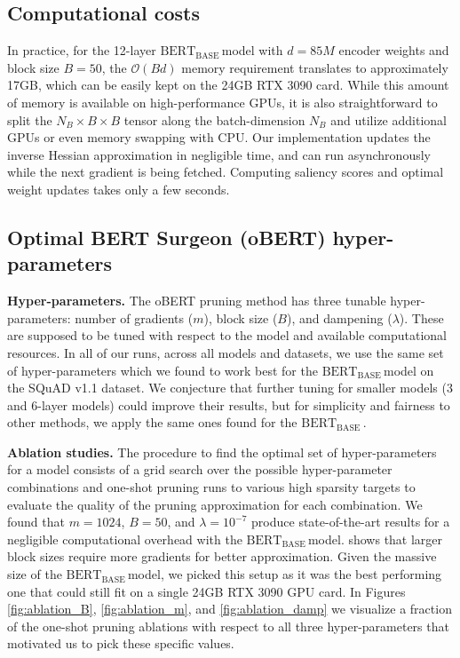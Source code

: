 \documentclass[11pt]{article}
\newcommand{\bert}{$\textrm{BERT}_{\textrm{BASE}}\,$}
\begin{document}
\subsection{Computational costs}
\label{app:computational_costs}
In practice, for the 12-layer \bert model with $d=85M$ encoder weights and block size $B=50$, the $\mathcal{O}(Bd)$ memory requirement translates to approximately 17GB, which can be easily kept on the 24GB RTX 3090 card. While this amount of memory is available on high-performance GPUs, it is also straightforward to split the $N_B \times B \times B$ tensor along the batch-dimension $N_B$ and utilize additional GPUs or even memory swapping with CPU. Our implementation updates the inverse Hessian approximation in negligible time, and can run asynchronously while the next gradient is being fetched. Computing saliency scores and optimal weight updates takes only a few seconds.

\subsection{Optimal BERT Surgeon (oBERT) hyper-parameters}
\label{app:obs-hyperparams}
\noindent\textbf{Hyper-parameters.} The oBERT pruning method has three tunable hyper-parameters: number of gradients ($m$), block size ($B$), and dampening ($\lambda$). These are supposed to be tuned with respect to the model and available computational resources. In all of our runs, across all models and datasets, we use the same set of hyper-parameters which we found to work best for the \bert model on the SQuAD v1.1 dataset. We conjecture that further tuning for smaller models (3 and 6-layer models) could improve their results, but for simplicity and fairness to other methods, we apply the same ones found for the \bert.

\noindent\textbf{Ablation studies.} The procedure to find the optimal set of hyper-parameters for a model consists of a grid search over the possible hyper-parameter combinations and one-shot pruning runs to various high sparsity targets to evaluate the quality of the pruning approximation for each combination. We found that $m=1024$, $B=50$, and $\lambda=10^{-7}$ produce state-of-the-art results for a negligible computational overhead with the \bert model. \citet{Frantar2021EfficientMA} shows that larger block sizes require more gradients for better approximation. Given the massive size of the \bert model, we picked this setup as it was the best performing one that could still fit on a single 24GB RTX 3090 GPU card. In Figures \ref{fig:ablation_B}, \ref{fig:ablation_m}, and \ref{fig:ablation_damp} we visualize a fraction of the one-shot pruning ablations with respect to all three hyper-parameters that motivated us to pick these specific values.
\end{document}
